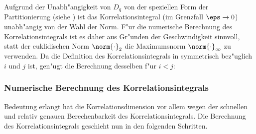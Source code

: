 Aufgrund der Unabh"angigkeit von $D_q$ von der speziellen Form der Partitionierung
(siehe ) ist das Korrelationsintegral (im Grenzfall $\eps\to0$) unabh"angig von
der Wahl der Norm. F"ur die numerische Berechnung des Korrelationsintegrals ist es daher
aus Gr"unden der Geschwindigkeit sinnvoll, statt der euklidischen Norm $\norm{\cdot}_2$ die
Maximumsnorm $\norm{\cdot}_\infty$ zu verwenden. Da die Definition des
Korrelationsintegrals in  symmetrisch bez"uglich $i$ und $j$ ist, gen"ugt
die Berechnung desselben f"ur $i<j$:



\subsubsection{Numerische Berechnung des Korrelationsintegrals}
Bedeutung erlangt hat die Korrelationsdimension vor allem wegen der schnellen und
relativ genauen Berechenbarkeit des Korrelationsintegrals. 
Die Berechnung des Korrelationsintegrals geschieht nun in den folgenden Schritten.
